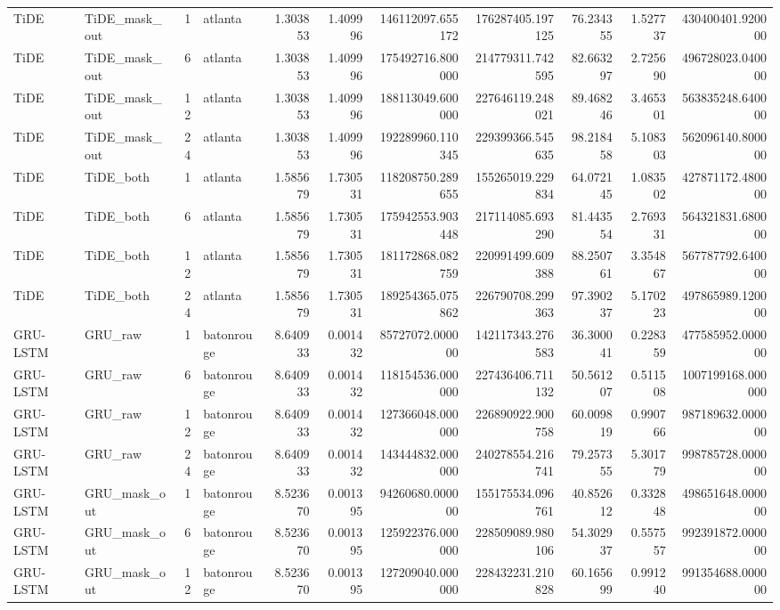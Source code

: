 \begin{longtable}{llrlrrrrrrr}
TiDE & TiDE\_mask\_out & 1 & atlanta & 1.303853 & 1.409996 & 146112097.655172 & 176287405.197125 & 76.234355 & 1.527737 & 430400401.920000 \\
TiDE & TiDE\_mask\_out & 6 & atlanta & 1.303853 & 1.409996 & 175492716.800000 & 214779311.742595 & 82.663297 & 2.725690 & 496728023.040000 \\
TiDE & TiDE\_mask\_out & 12 & atlanta & 1.303853 & 1.409996 & 188113049.600000 & 227646119.248021 & 89.468246 & 3.465301 & 563835248.640000 \\
TiDE & TiDE\_mask\_out & 24 & atlanta & 1.303853 & 1.409996 & 192289960.110345 & 229399366.545635 & 98.218458 & 5.108303 & 562096140.800000 \\
TiDE & TiDE\_both & 1 & atlanta & 1.585679 & 1.730531 & 118208750.289655 & 155265019.229834 & 64.072145 & 1.083502 & 427871172.480000 \\
TiDE & TiDE\_both & 6 & atlanta & 1.585679 & 1.730531 & 175942553.903448 & 217114085.693290 & 81.443554 & 2.769331 & 564321831.680000 \\
TiDE & TiDE\_both & 12 & atlanta & 1.585679 & 1.730531 & 181172868.082759 & 220991499.609388 & 88.250761 & 3.354867 & 567787792.640000 \\
TiDE & TiDE\_both & 24 & atlanta & 1.585679 & 1.730531 & 189254365.075862 & 226790708.299363 & 97.390237 & 5.170223 & 497865989.120000 \\
GRU-LSTM & GRU\_raw & 1 & batonrouge & 8.640933 & 0.001432 & 85727072.000000 & 142117343.276583 & 36.300041 & 0.228359 & 477585952.000000 \\
GRU-LSTM & GRU\_raw & 6 & batonrouge & 8.640933 & 0.001432 & 118154536.000000 & 227436406.711132 & 50.561207 & 0.511508 & 1007199168.000000 \\
GRU-LSTM & GRU\_raw & 12 & batonrouge & 8.640933 & 0.001432 & 127366048.000000 & 226890922.900758 & 60.009819 & 0.990766 & 987189632.000000 \\
GRU-LSTM & GRU\_raw & 24 & batonrouge & 8.640933 & 0.001432 & 143444832.000000 & 240278554.216741 & 79.257355 & 5.301779 & 998785728.000000 \\
GRU-LSTM & GRU\_mask\_out & 1 & batonrouge & 8.523670 & 0.001395 & 94260680.000000 & 155175534.096761 & 40.852612 & 0.332848 & 498651648.000000 \\
GRU-LSTM & GRU\_mask\_out & 6 & batonrouge & 8.523670 & 0.001395 & 125922376.000000 & 228509089.980106 & 54.302937 & 0.557557 & 992391872.000000 \\
GRU-LSTM & GRU\_mask\_out & 12 & batonrouge & 8.523670 & 0.001395 & 127209040.000000 & 228432231.210828 & 60.165699 & 0.991240 & 991354688.000000 \\

\end{longtable}
